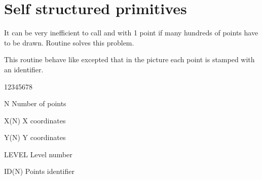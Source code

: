 \section{Self structured primitives}

It can be very inefficient to call  and  with 1 point 
if  many hundreds of points have to be drawn. 
Routine  solves this problem.

\Action
This routine behave like  excepted that in the \HIGZ{}
picture each point is stamped with an identifier.
\Pdesc
\begin{DLtt}{12345678}
   \item[N] Number of points
   \item[X(N)] X coordinates
   \item[Y(N)] Y coordinates
   \item[LEVEL] Level number
   \item[ID(N)] Points identifier
\end{DLtt}

